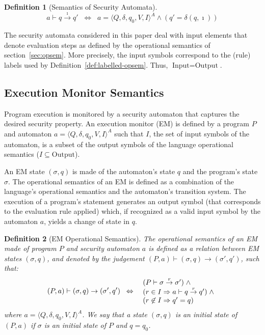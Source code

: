 \documentclass[10pt,notitlepage,twoside]{article}
\newcommand{\aut}{a}
\newcommand{\automata}[5]{\langle #1,#2,#3,#4,#5 \rangle^A}
\newcommand{\theautomaton}{\automata{Q}{\delta}{q_0}{V}{I}}
\newcommand{\emdef}[2]{(#1,#2)}
\newtheorem{definition}{Definition}
\begin{document}
\begin{definition}[Semantics of Security Automata]
\begin{displaymath}
a \vdash q \stackrel{\imath}{\rightarrow} q'  \;\;\Leftrightarrow\;\; a = \theautomaton\wedge (q' = \delta(q,\imath))
\end{displaymath}
\end{definition}


The security automata considered in this paper deal with  input elements that  denote evaluation steps as defined by the operational semantics of section~\ref{sec:opsem}.
More precisely, the input symbols correspond to the (rule) labels used by Definition~\ref{def:labelled-opsem}. Thus, $\textrm{Input} = \textrm{Output}$.


\subsection{Execution Monitor Semantics}

Program execution is monitored by a security automaton that captures the desired security property. An execution monitor (EM) is defined by a program $P$ and automaton $\aut = \theautomaton$ such that $I$, the set of input symbols of the automaton, is a subset of the output symbols of the language operational semantics ($I \subseteq \textrm{Output}$).

An EM state $(\sigma,q)$ is made of the automaton's state $q$ and the program's state $\sigma$. The operational semantics of an EM is defined as a combination of the language's operational semantics and the automaton's transition system. The execution of a program's statement generates an output symbol (that corresponds to the evaluation rule applied) which, if recognized as a valid input symbol by the automaton $a$, yields a change of state in $q$.  

\begin{definition}[EM Operational Semantics]
The operational semantics of an EM made of program $P$ and security automaton $\aut$ is defined as a relation between EM states $(\sigma,q)$, and denoted by the judgement $\emdef{P}{\aut} \vdash (\sigma,q) \rightarrow (\sigma',q')$, such that:
\begin{displaymath}
\emdef{P}{\aut} \vdash (\sigma,q) \rightarrow (\sigma',q')  \;\;\Leftrightarrow\;\;
\begin{array}[c]{l}
(P \vdash \sigma \stackrel{r}{\rightarrow} \sigma') \;\wedge\; \\
(r \in I \Rightarrow a \vdash q \stackrel{r}{\rightarrow} q') \;\wedge \\
(r \not\in I \Rightarrow q' = q)
\end{array}
\end{displaymath}
where $\aut = \theautomaton$. We say that a state $(\sigma,q)$ is an initial state of $\emdef{P}{\aut}$ if $\sigma$ is an initial state of $P$ and $q = q_0$.
\end{definition}
\end{document}
